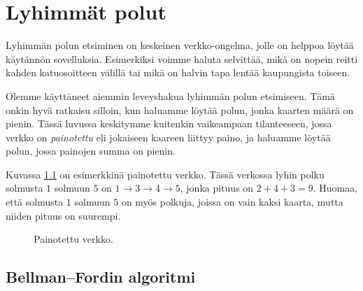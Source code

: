 \chapter{Lyhimmät polut}

Lyhimmän polun etsiminen on keskeinen verkko-ongelma,
jolle on helppoa löytää käytännön sovelluksia.
Esimerkiksi voimme haluta selvittää,
mikä on nopein reitti kahden katuosoitteen välillä
tai mikä on halvin tapa lentää kaupungista toiseen.

Olemme käyttäneet aiemmin leveyshakua lyhimmän
polun etsimiseen.
Tämä onkin hyvä ratkaisu silloin, kun haluamme löytää polun,
jonka kaarten määrä on pienin.
Tässä luvussa keskitymme kuitenkin vaikeampaan
tilanteeseen, jossa verkko on \emph{painotettu}
eli jokaiseen kaareen liittyy paino, ja haluamme löytää polun,
jossa painojen summa on pienin.

Kuvassa \ref{fig:verpai} on esimerkkinä painotettu verkko.
Tässä verkossa lyhin polku solmusta $1$ solmuun $5$ on
$1 \rightarrow 3 \rightarrow 4 \rightarrow 5$,
jonka pituus on $2+4+3=9$.
Huomaa, että solmusta $1$ solmuun $5$ on myös polkuja,
joissa on vain kaksi kaarta, mutta niiden pituus on suurempi.

\begin{figure}
\center
\begin{center}
\end{center}
\caption{Painotettu verkko.}
\label{fig:verpai}
\end{figure}

\section{Bellman–Fordin algoritmi}

